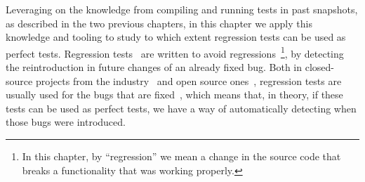 Leveraging on the knowledge from compiling and running tests in past snapshots, as described in the two previous chapters, in this chapter we apply this knowledge and tooling to study to which extent regression tests can be used as perfect tests. 
Regression tests~\cite{desikan2006softwareRegressionTesting,wahl1999overview} are written to avoid regressions~\footnote{In this chapter, by ``regression'' we mean a change in the source code that breaks a functionality that was working properly.}, by detecting the reintroduction in future changes of an already fixed bug. 
Both in closed-source projects from the industry~\cite{ali2019search,onoma1998regression,engstrom2010qualitative} and open source ones~\cite{schmidt2001leveraging}, 
regression tests are usually used for the bugs that are fixed~\cite{perscheid2017studying}, which means that, in theory, if these tests can be used as perfect tests, we have a way of automatically detecting when those bugs were introduced.

